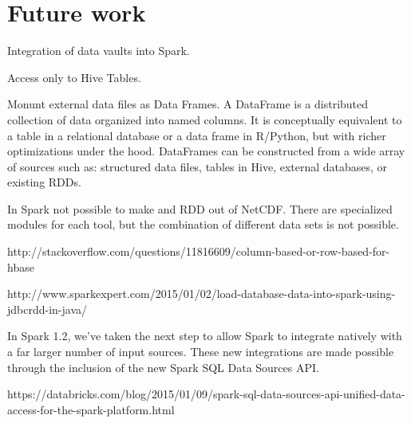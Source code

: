 \section{Future work}
\label{future_work}

Integration of data vaults into Spark.

Access only to Hive Tables.

Monunt external data files as Data Frames.
A DataFrame is a distributed collection of data organized into named columns. It is conceptually equivalent to a table in a relational database or a data frame in R/Python, but with richer optimizations under the hood. DataFrames can be constructed from a wide array of sources such as: structured data files, tables in Hive, external databases, or existing RDDs.

In Spark not possible to make and RDD out of NetCDF.
There are specialized modules for each tool, but the combination of different data sets is not possible.


http://stackoverflow.com/questions/11816609/column-based-or-row-based-for-hbase


http://www.sparkexpert.com/2015/01/02/load-database-data-into-spark-using-jdbcrdd-in-java/

In Spark 1.2, we’ve taken the next step to allow Spark to integrate natively with a far larger number of input sources.  These new integrations are made possible through the inclusion of the new Spark SQL Data Sources API.

https://databricks.com/blog/2015/01/09/spark-sql-data-sources-api-unified-data-access-for-the-spark-platform.html
